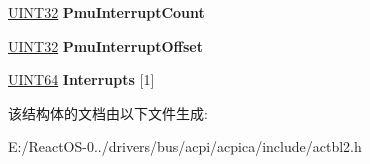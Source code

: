 \begin{DoxyCompactItemize}
\item 
\mbox{\label{structacpi__iort__smmu_a37125fe624efdff71dfd17ee85fa3470}} 
\hyperlink{_processor_bind_8h_ae1e6edbbc26d6fbc71a90190d0266018}{U\+I\+N\+T32} {\bfseries Pmu\+Interrupt\+Count}
\item 
\mbox{\label{structacpi__iort__smmu_ab968a65afdbf42df8a780e9f88aa588f}} 
\hyperlink{_processor_bind_8h_ae1e6edbbc26d6fbc71a90190d0266018}{U\+I\+N\+T32} {\bfseries Pmu\+Interrupt\+Offset}
\item 
\mbox{\label{structacpi__iort__smmu_abd2e0b0b3713d17a74a5513d27e70c79}} 
\hyperlink{_processor_bind_8h_a57be03562867144161c1bfee95ca8f7c}{U\+I\+N\+T64} {\bfseries Interrupts} \mbox{[}1\mbox{]}
\end{DoxyCompactItemize}


该结构体的文档由以下文件生成\+:\begin{DoxyCompactItemize}
\item 
E\+:/\+React\+O\+S-\/0../drivers/bus/acpi/acpica/include/actbl2.\+h\end{DoxyCompactItemize}

